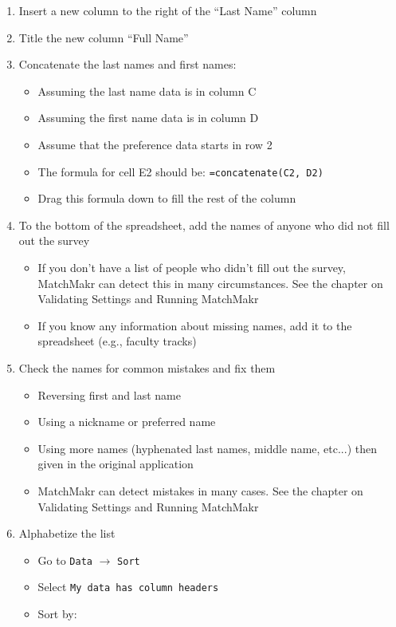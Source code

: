 \begin{enumerate}
\begin{itemize}
		\end{itemize}
	\item Insert a new column to the right of the ``Last Name'' column
	\item Title the new column ``Full Name''
	\item Concatenate the last names and first names:
		\begin{itemize}
			\item Assuming the last name data is in column C
			\item Assuming the first name data is in column D
			\item Assume that the preference data starts in row 2
			\item The formula for cell E2 should be: \texttt{=concatenate(C2, D2)}
			\item Drag this formula down to fill the rest of the column
		\end{itemize}
	\item To the bottom of the spreadsheet, add the names of anyone who did not fill out the survey
		\begin{itemize}
			\item If you don't have a list of people who didn't fill out the survey, MatchMakr can detect this in many circumstances.  See the chapter on Validating Settings and Running MatchMakr
			\item If you know any information about missing names, add it to the spreadsheet (e.g., faculty tracks)
		\end{itemize}
	\item Check the names for common mistakes and fix them
		\begin{itemize}
			\item Reversing first and last name
			\item Using a nickname or preferred name
			\item Using more names (hyphenated last names, middle name, etc...) then given in the original application
			\item MatchMakr can detect mistakes in many cases.  See the chapter on Validating Settings and Running MatchMakr
		\end{itemize}
	\item Alphabetize the list
		\begin{itemize}
			\item Go to \texttt{Data} $\rightarrow$ \texttt{Sort}
			\item Select \texttt{My data has column headers}
			\item Sort by:

\end{itemize}
\end{enumerate}
